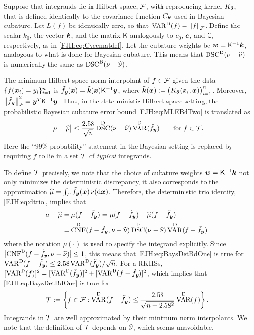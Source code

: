 \documentclass[graybox,footinfo]{svmult}
\DeclareMathOperator{\algn}{CNF}
\DeclareMathOperator{\disc}{DSC}
\DeclareMathOperator{\Var}{VAR}
\begin{document}
Suppose that integrands lie in Hilbert space,  ${\mathcal{F}}$, with reproducing kernel 
$K_{\boldsymbol{\theta}}$, that is defined identically to the covariance function 
$C_{\boldsymbol{\theta}}$ used in Bayesian cubature.  Let $L(f)$ be identically zero, 
so that $\Var^{\Dt}(f) = \norm{f}_{\calF}$.  Define the scalar $k_0$, the vector ${\boldsymbol{k}}$, 
and the matrix $\mathsf{K}$ analogously to $c_0$, ${\boldsymbol{c}}$, and $\mathsf{C}$, 
respectively, as in  \eqref{FJH:eq:Cvecmatdef}.  Let the cubature weights be ${\boldsymbol{w}} = 
\mathsf{K}^{-1} {\boldsymbol{k}}$, analogous to what is done for Bayesian cubature.  This means 
that $\disc^\Dt(\nu - \hnu)$ is numerically the same as $\disc^\Ba(\nu - \hnu)$.

\begin{FJHLesson}
	\FJHLessonFourteen
\end{FJHLesson}

The minimum Hilbert space norm 
interpolant of $f \in {\mathcal{F}}$ given the data $ \{f({\boldsymbol{x}}_i )= y_i\}_{i=1}^n$ is $\tilde{f}_{\boldsymbol{y}}({\boldsymbol{x}}) = 
\tilde{{\boldsymbol{k}}}({\boldsymbol{x}}) \mathsf{K}^{-1} {\boldsymbol{y}}$, where $\tilde{{\boldsymbol{k}}}({\boldsymbol{x}}) := 
\bigl( K_{\boldsymbol{\theta}}({\boldsymbol{x}}_i,{\boldsymbol{x}}) \bigr)_{i=1}^n$.  Moreover, $\left \lVert \tilde{f}_{\boldsymbol{y}} \right \rVert^2_{{\mathcal{F}}} = 
{\boldsymbol{y}}^T 
\mathsf{K}^{-1} {\boldsymbol{y}}$.  Thus, in the deterministic Hilbert space setting, the probabilistic 
Bayesian cubature error bound \eqref{FJH:eq:MLEBdTwo} is translated as
\begin{equation} \label{FJH:eq:BaysDetBdOne}
\abs{\mu - \hmu} \le \frac{2.58}{\sqrt{n}} \disc^{\Dt}(\nu - \hnu) \Var^{\Dt}(\tf_\bsy)  
\qquad \text{for } f\in \calT.
\end{equation}
Here the ``$99\%$ probability'' statement in the Bayesian setting is replaced by requiring 
$f$ to lie in a set ${\mathcal{T}}$ of \emph{typical} integrands. 

To define ${\mathcal{T}}$ precisely, we note that the choice of cubature weights ${\boldsymbol{w}} = 
\mathsf{K}^{-1} {\boldsymbol{k}}$ not only minimizes the deterministic discrepancy, it also 
corresponds to the approximation $\widehat{\mu}= \int_{{\mathcal{X}}} \tilde{f}_{\boldsymbol{y}}({\boldsymbol{x}}) \, \nu(\mathrm{d} {\boldsymbol{x}})$.  
Therefore, the deterministic trio identity, \eqref{FJH:eq:dtrio}, implies that  
\begin{align*}
\mu - \hmu & = \mu(f - \tf_\bsy) = \mu(f - \tf_\bsy) - \hmu(f - \tf_\bsy) \\
& = \algn^{\Dt}(f - 
\tf_\bsy,\nu - \hnu) \disc^\Dt(\nu - \hnu) \Var^\Dt(f - \tf_\bsy),
\end{align*}
where the notation $\mu(\cdot)$ is used to specify the integrand explicitly. Since 
$\abs{\algn^{\Dt}(f - 
	\tf_\bsy,\nu - \hnu)} \le 1$, this means that \eqref{FJH:eq:BaysDetBdOne} is true for 
	$\Var^\Dt(f - \tf_\bsy) \le 2.58 \Var^{\Dt}(\tf_\bsy) /\sqrt{n}$. For a
RKHSs, $[\Var^\Dt(f)]^2 = [\Var^\Dt(\tf_\bsy)]^2 + 
[\Var^\Dt(f - \tf_\bsy)]^2$, which implies that \eqref{FJH:eq:BaysDetBdOne} is true for 
\begin{equation*}
\calT := \left \{f \in \calF : \Var^\Dt(f - \tf_\bsy) \le \frac{2.58}{\sqrt{n + 2.58^2}} 
\Var^{\Dt}(f) 
\right\} .
\end{equation*}
Integrands in ${\mathcal{T}}$ are well approximated by their minimum norm interpolants.  We 
note that the definition of ${\mathcal{T}}$ 
depends on $\widehat{\nu}$, which seems unavoidable.
\end{document}
